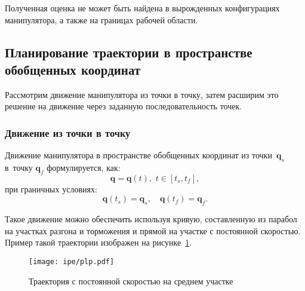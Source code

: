 Полученная оценка не может быть найдена в вырожденных конфигурациях манипулятора, а также на границах рабочей области.


\subsection{Планирование траектории в пространстве обобщенных координат}

Рассмотрим движение манипулятора из точки в точку, затем расширим это решение на движение через заданную последовательность точек.


\vspace{0.5cm}
\subsubsection{Движение из точки в точку}

Движение манипулятора в пространстве обобщенных координат из точки~$ \mathbf{q}_s $ в~точку $ \mathbf{q}_f $ формулируется, как:
\begin{equation}
	\mathbf{q} = \mathbf{q}(t),\,\,t \in [t_s, t_f],
\end{equation}
при граничных условиях:
\begin{equation}
	\mathbf{q}(t_s) = \mathbf{q}_s, 
	\quad
	\mathbf{q}(t_f) = \mathbf{q}_f.
\end{equation}


Такое движение можно обеспечить используя кривую, составленную из парабол на участках разгона и торможения и прямой на участке с постоянной скоростью. Пример такой траектории изображен на рисунке~\ref{img:plp}.

\begin{figure}[h!]
	\centering\texttt{[image: ipe/plp.pdf]}
	\vspace{0.5cm}
	\caption{Траектория с постоянной скоростью на среднем участке}
	\label{img:plp}
\end{figure}

